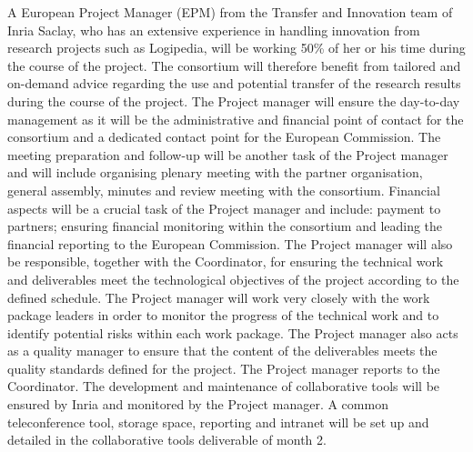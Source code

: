 \begin{workpackage}[id=management,type=MGT,wphases=1-48,
  short=Management,
  title=Management,
  InrRM=44,
  lead=Inr]
\begin{tasklist}
\begin{task}[id=admin,title=Administrative and Financial Management,shorttitle=Adm.\&Fin.,lead=Inr,InrRM=15,wphases=1-48]
    A European Project Manager (EPM) from the Transfer and Innovation
    team of Inria Saclay, who has an extensive experience in handling
    innovation from research projects such as Logipedia, will be working
    50\% of her or his time during the course of the project.
     The
    consortium will therefore benefit from tailored and on-demand
    advice regarding the use and potential transfer of the research
    results during the course of the project.  The Project manager will ensure
    the
    day-to-day management as it will be the administrative and
    financial point of contact for the consortium and a dedicated
    contact point for the European Commission. The meeting preparation
    and follow-up will be another task of the Project manager and will include
    organising plenary meeting with the partner organisation, general
    assembly, minutes and review meeting with the consortium. Financial
    aspects will be a crucial task of the Project manager and include:
    payment to
    partners; ensuring financial monitoring within the consortium and
    leading the financial reporting to the European Commission.  The
    Project manager will also be responsible, together with the 
    Coordinator, for ensuring the technical work and deliverables meet
    the technological objectives of the project according to the
    defined schedule. The Project manager will work very closely with the work
    package leaders in order to monitor the progress of the technical
    work and to identify potential risks within each work package.
    The Project manager also
    acts as a quality manager to ensure that the content of the
    deliverables meets the quality standards defined for the
    project. The Project manager reports to the Coordinator.  The
    development and maintenance of collaborative tools will be ensured
    by Inria and monitored by the Project manager. A common teleconference tool,
    storage space, reporting and intranet will be set up and detailed
    in the collaborative tools deliverable of month 2.
  \end{task}


\end{tasklist}
\end{workpackage}
